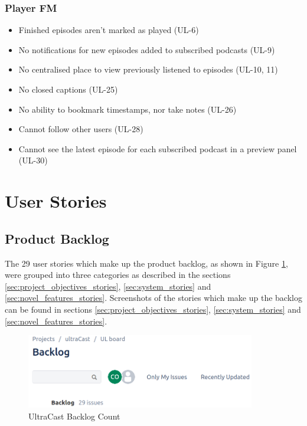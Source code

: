 \documentclass[12pt]{article}
\begin{document}
\subsubsection{Player FM\cite{player_fm}}
\begin{itemize}
    \item Finished episodes aren’t marked as played (UL-6)
    \item No notifications for new episodes added to subscribed podcasts (UL-9)
    \item No centralised place to view previously listened to episodes (UL-10, 11)
    \item No closed captions (UL-25)
    \item No ability to bookmark timestamps, nor take notes (UL-26)
    \item Cannot follow other users (UL-28)
    \item Cannot see the latest episode for each subscribed podcast in a preview panel (UL-30)
\end{itemize}

\fi


\newpage
\section{User Stories}

\subsection{Product Backlog}

The 29 user stories which make up the product backlog, as shown in Figure \ref{fig:backlog}, were grouped into three categories as described in the sections \ref{sec:project_objectives_stories}, \ref{sec:system_stories} and \ref{sec:novel_features_stories}.
Screenshots of the stories which make up the backlog can be found in sections \ref{sec:project_objectives_stories}, \ref{sec:system_stories} and \ref{sec:novel_features_stories}.

\begin{figure}[ht]
    \centering
    \includegraphics[width=10cm]{resources/project_backlog}
    \caption{UltraCast Backlog Count}
    \label{fig:backlog}
\end{figure}
\end{document}
